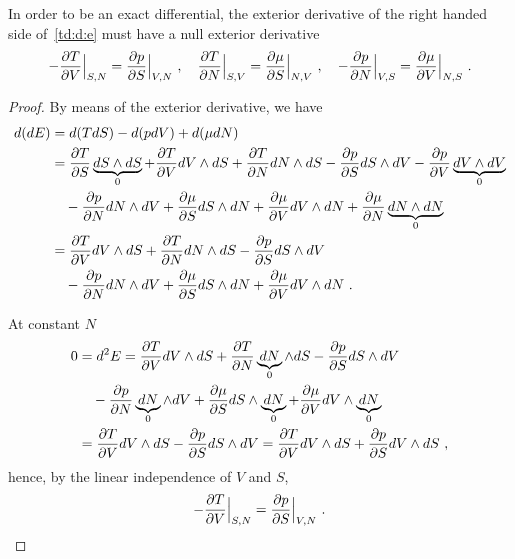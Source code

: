     In order to be an exact differential, the exterior derivative of the right handed side of~\eqref{td:d:e} must have a null exterior derivative
    \begin{equation}\label{td:int:e}
        - \frac{\partial T}{\partial V} \Big \vert_{S,N} = \frac{\partial p}{\partial S} \Big \vert_{V,N} ~, \quad 
        \frac{\partial T}{\partial N} \Big \vert_{S,V} = \frac{\partial\mu}{\partial S} \Big \vert_{N, V} ~, \quad 
        - \frac{\partial p}{\partial N} \Big \vert_{V,S} = \frac{\partial\mu}{\partial V} \Big \vert_{N, S} ~. 
    \end{equation}
    \begin{proof}
        By means of the exterior derivative, we have 
        \begin{equation*}
        \begin{aligned}
            d (dE) & = d (T dS) - d (p dV) + d (\mu dN) \\ & = \frac{\partial T}{\partial S} \underbrace{dS \wedge dS}_0 + \frac{\partial T}{\partial V} dV \wedge dS + \frac{\partial T}{\partial N} dN \wedge dS - \frac{\partial p}{\partial S} dS \wedge dV - \frac{\partial p}{\partial V} \underbrace{dV \wedge dV}_0 \\ & \quad - \frac{\partial p}{\partial N} dN \wedge dV + \frac{\partial\mu}{\partial S} dS \wedge dN + \frac{\partial\mu}{\partial V} dV \wedge dN + \frac{\partial\mu}{\partial N} \underbrace{dN \wedge dN}_0 \\ & = \frac{\partial T}{\partial V} dV \wedge dS + \frac{\partial T}{\partial N} dN \wedge dS - \frac{\partial p}{\partial S} dS \wedge dV \\ & \quad - \frac{\partial p}{\partial N} dN \wedge dV + \frac{\partial\mu}{\partial S} dS \wedge dN + \frac{\partial\mu}{\partial V} dV \wedge dN ~.
        \end{aligned}
        \end{equation*}

        At constant $N$ 
        \begin{equation*}
        \begin{aligned}
            0 & = d^2 E = \frac{\partial T}{\partial V} dV \wedge dS + \frac{\partial T}{\partial N} \underbrace{dN}_0 \wedge dS - \frac{\partial p}{\partial S} dS \wedge dV \\ & \quad - \frac{\partial p}{\partial N} \underbrace{dN}_0 \wedge dV + \frac{\partial\mu}{\partial S} dS \wedge \underbrace{dN}_0 + \frac{\partial\mu}{\partial V} dV \wedge \underbrace{dN}_0 \\ & = \frac{\partial T}{\partial V} dV \wedge dS - \frac{\partial p}{\partial S} dS \wedge dV = \frac{\partial T}{\partial V} dV \wedge dS + \frac{\partial p}{\partial S} dV \wedge dS ~,
        \end{aligned}
        \end{equation*}
        hence, by the linear independence of $V$ and $S$,
        \begin{equation*}
            - \frac{\partial T}{\partial V} \Big \vert_{S,N} = \frac{\partial p}{\partial S} \Big \vert_{V,N} ~.
        \end{equation*}


\end{proof}
